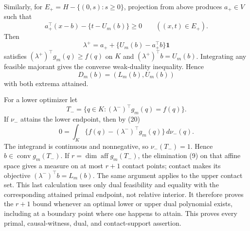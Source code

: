 Similarly, for \(E_+=H-\{(0,s):s\geq0\}\), projection from above produces \(a_+\in V\) such that
\[
 a_+^{\top}(x-b)-\{t-U_m(b)\}\geq0\qquad((x,t)\in E_+).
\]
Then
\[
 \lambda^+=a_++\{U_m(b)-a_+^{\top}b\}\mathbf1
\tag{22}
\]
satisfies \((\lambda^+)^{\top}g_m(q)\geq f(q)\) on \(K\) and \((\lambda^+)^{\top}b=U_m(b)\).  Integrating any feasible majorant gives the converse weak-duality inequality.  Hence
\[
 D_m(b)=(L_m(b),U_m(b))
\tag{23}
\]
with both extrema attained.

For a lower optimizer let
\[
 T_-=\{q\in K:(\lambda^-)^{\top}g_m(q)=f(q)\}.
\]
If \(\nu_-\) attains the lower endpoint, then by (20)
\[
 0=\int_K\{f(q)-(\lambda^-)^{\top}g_m(q)\}\,d\nu_-(q).
\]
The integrand is continuous and nonnegative, so \(\nu_-(T_-)=1\).  Hence \(b\in\operatorname{conv}g_m(T_-)\).  If \(r=\dim\operatorname{aff}g_m(T_-)\), the elimination (9) on that affine space gives a measure on at most \(r+1\) contact points; contact makes its objective \((\lambda^-)^{\top}b=L_m(b)\).  The same argument applies to the upper contact set.  This last calculation uses only dual feasibility and equality with the corresponding attained primal endpoint, not relative interior.  It therefore proves the \(r+1\) bound whenever an optimal lower or upper dual polynomial exists, including at a boundary point where one happens to attain.  This proves every primal, causal-witness, dual, and contact-support assertion.